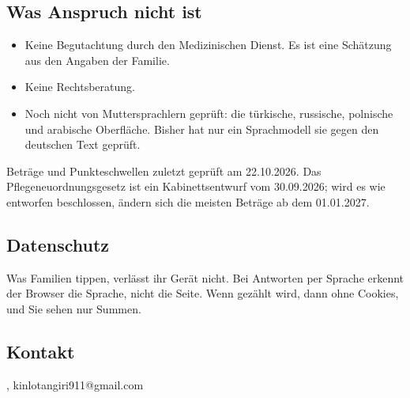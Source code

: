 \documentclass[fontsize=10pt,paper=a4,parskip=half]{scrartcl}
\begin{document}
\subsection*{Was Anspruch nicht ist}
\begin{itemize}
  \item Keine Begutachtung durch den Medizinischen Dienst. Es ist eine Schätzung
    aus den Angaben der Familie.
  \item Keine Rechtsberatung.
  \item Noch nicht von Muttersprachlern geprüft: die türkische, russische,
    polnische und arabische Oberfläche. Bisher hat nur ein Sprachmodell sie gegen
    den deutschen Text geprüft.
\end{itemize}
{\small Beträge und Punkteschwellen zuletzt geprüft am 22.10.2026. Das
Pflegeneuordnungsgesetz ist ein Kabinettsentwurf vom 30.09.2026; wird es wie
entworfen beschlossen, ändern sich die meisten Beträge ab dem 01.01.2027.\par}

\subsection*{Datenschutz}
Was Familien tippen, verlässt ihr Gerät nicht. Bei Antworten per Sprache erkennt der
Browser die Sprache, nicht die Seite. Wenn gezählt wird, dann ohne Cookies, und Sie
sehen nur Summen.

\subsection*{Kontakt}
,  \quad kinlotangiri911@gmail.com \quad {}
\end{document}
